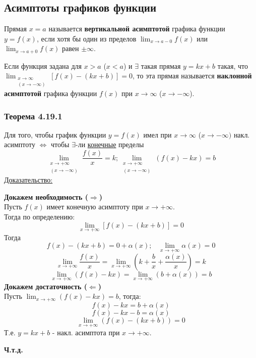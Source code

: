 \documentclass[12pt]{article}
\begin{document}
    \subsection{Асимптоты графиков функции}
    \noindent Прямая $x = a$ называется \textbf{вертикальной асимптотой} графика функции $y = f(x)$, если хотя бы один из пределов $\lim_{x\to a-0} f(x)$ или $\lim_{x\to a + 0} f(x)$ равен $\pm \infty$.\par\noindent
    Если функция задана для $x > a$ ($x < a$) и $\exists$ такая прямая $y = kx+b$ такая, что $\lim_{\substack{x \to \infty\\(x \to -\infty)}} [ f(x) - (kx+b) ] = 0$, то эта прямая называется \textbf{наклонной асимптотой} графика функции $f(x)$ при $x \to \infty$ ($x \to -\infty$).
    
    \subsubsection*{Теорема 4.19.1}\label{th:4.19.1}
    Для того, чтобы график функции $y = f(x)$ имел при $x \to \infty$ ($x \to -\infty)$ накл. асимптоту $\Longleftrightarrow$ чтобы $\exists$-ли \underline{конечные} пределы
    \[ \lim_{\substack{x\to +\infty\\(x \to -\infty)}} \frac{f(x)}{x} = k; \lim_{\substack{x\to +\infty\\(x \to -\infty)}} (f(x) - kx) = b \]
    \underline{Доказательство:}
    \begin{adjustwidth}{1.5em}{1.5em}
        \textbf{Докажем необходимость ($\Rightarrow$)}\\
        Пусть $f(x)$ имеет конечную асимптоту при $x \to +\infty$.\\
        Тогда по определению:
        \[ \lim_{x\to +\infty} [ f(x) - (kx+b) ] = 0 \]
        Тогда
        \[ f(x) - (kx+b) = 0 + \alpha(x); \;\;\; \lim_{x \to +\infty} \alpha(x) = 0 \]
        \[ \lim_{x \to +\infty}\frac{f(x)}{x} = \lim_{x\to +\infty} (k + \frac{b}{x} + \frac{\alpha(x)}{x}) = k \]
        \[ \lim_{x \to +\infty} (f(x) - kx) = \lim_{x \to +\infty}(b + \alpha(x)) = b \]\noindent
        \textbf{Докажем достаточность ($\Leftarrow$)}\\
        Пусть $\lim_{x\to +\infty} (f(x) - kx) = b$, тогда:
        \[f(x) - kx = b + \alpha(x)\]
        \[f(x) - kx - b = \alpha(x)\]
        \[ \lim_{x\to +\infty} (f(x) - (kx+b)) = 0 \]
        Т.е. $y = kx+b$ - накл. асимптота при $x \to +\infty$.
        \begin{center}
            \textbf{Ч.т.д.}
        \end{center}
    \end{adjustwidth}
    
\end{document}
